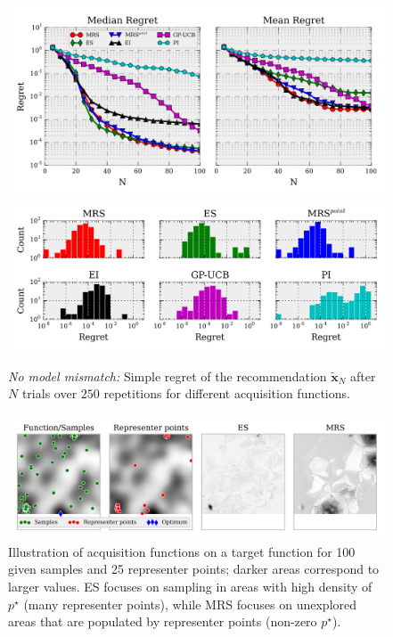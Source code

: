 

\begin{block}{}
\begin{center}


\begin{figure}
\centering
\includegraphics[width=.8\columnwidth]{../pics/empirical_comparison} \\
\includegraphics[width=.8\columnwidth]{../pics/hist}
\caption{\emph{No model mismatch:} Simple regret of the recommendation $\mathbf{\tilde x}_N$ after $N$ trials over $250$ repetitions for different acquisition functions.}
\label{fig:empirical_comparison}
\end{figure}


\begin{figure}
\centering
\includegraphics[width=.9\textwidth]{../pics/es_analysis}
\caption{Illustration of acquisition functions on a target function for
100 given samples and 25 representer points; darker areas correspond to larger values. ES focuses on sampling in areas with high density of $p^\star$ (many representer points), while MRS focuses on unexplored areas that are populated by representer points (non-zero $p^\star$).
}
\label{fig:es_analysis}
\end{figure}



\end{center}
\end{block}
